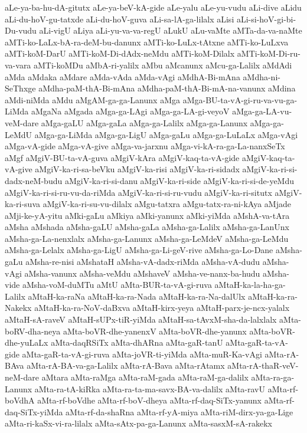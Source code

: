 {aLe-ya-ba-hu-dA-gitutx
aLe-ya-beV-kA-gide
aLe-yalu
aLe-yu-vudu
aLi-dive
aLidu
aLi-du-hoV-gu-tatxde
aLi-du-hoV-guva
aLi-sa-lA-ga-lilalx
aLisi
aLi-si-hoV-gi-bi-Du-vudu
aLi-vigU
aLiya
aLi-yu-va-va-regU
aLukU
aLu-vaMte
aMTa-da-va-naMte
aMTi-ko-LaLx-bA-ra-deM-bu-danunx
aMTi-ko-LuLx-tAtxne
aMTi-ko-LuLxva
aMTi-koM-DarU
aMTi-koM-Di-dAdx-neMdu
aMTi-koM-Dilalx
aMTi-koM-Di-ru-va-vara
aMTi-koMDu
aMbA-ri-yalilx
aMbu
aMcanunx
aMcu-ga-Lalilx
aMdAdi
aMda
aMdaka
aMdare
aMda-vAda
aMda-vAgi
aMdhA-Bi-mAna
aMdha-ni-SeThxge
aMdha-paM-thA-Bi-mAna
aMdha-paM-thA-Bi-mA-na-vanunx
aMdina
aMdi-niMda
aMdu
aMgAM-ga-ga-Lanunx
aMga
aMga-BU-ta-vA-gi-ru-va-vu-ga-LiMda
aMgaNa
aMgada
aMga-ga-LAgi
aMga-ga-LA-gi-veyoV
aMga-ga-LA-vu-veM-dare
aMga-gaLU
aMga-gaLa
aMga-ga-Lalilx
aMga-ga-Lanunx
aMga-ga-LeMdU
aMga-ga-LiMda
aMga-ga-LigU
aMga-gaLu
aMga-ga-LuLaLx
aMga-vAgi
aMga-vA-gide
aMga-vA-give
aMga-va-jarxnu
aMga-vi-kA-ra-ga-La-nanxSeTx
aMgf
aMgiV-BU-ta-vA-guva
aMgiV-kAra
aMgiV-kaq-ta-vA-gide
aMgiV-kaq-ta-vA-give
aMgiV-ka-ri-sa-beVku
aMgiV-ka-risi
aMgiV-ka-ri-sidadx
aMgiV-ka-ri-si-dadx-neM-budu
aMgiV-ka-ri-si-danu
aMgiV-ka-ri-side
aMgiV-ka-ri-si-de-yeMdu
aMgiV-ka-ri-si-ru-vu-da-riMda
aMgiV-ka-ri-si-ru-vudu
aMgiV-ka-ri-situtx
aMgiV-ka-ri-suva
aMgiV-ka-ri-su-vu-dilalx
aMgu-tatxra
aMgu-tatx-ra-ni-kAya
aMjade
aMji-ke-yA-yitu
aMki-gaLu
aMkiya
aMki-yanunx
aMki-yiMda
aMshA-va-tAra
aMsha
aMshada
aMsha-gaLU
aMsha-gaLa
aMsha-ga-Lalilx
aMsha-ga-LanUnx
aMsha-ga-La-nenxlalx
aMsha-ga-Lanunx
aMsha-ga-LeMdeV
aMsha-ga-LeMdu
aMsha-ga-Lelalx
aMsha-ga-LigU
aMsha-ga-Li-geV-rive
aMsha-ga-Lo-Dane
aMsha-gaLu
aMsha-re-nisi
aMshataH
aMsha-vA-dadx-riMda
aMsha-vA-dudu
aMsha-vAgi
aMsha-vanunx
aMsha-veMdu
aMshaveV
aMsha-ve-nanx-ba-hudu
aMsha-vide
aMsha-voM-duMTu
aMtU
aMta-BUR-ta-vA-gi-ruva
aMtaH-ka-la-ha-ga-Lalilx
aMtaH-ka-raNa
aMtaH-ka-ra-Nada
aMtaH-ka-ra-Na-dalUlx
aMtaH-ka-ra-Nakekx
aMtaH-ka-ra-NoV-daBxva
aMtaH-kirx-yeya
aMtaH-parx-je-ncx-yalalx
aMtaH-sA-raveV
aMtaH-sUPx-tiR-yiMda
aMtaH-sa-tAvxM-sha-da-lalxlalx
aMta-boRV-dha-neya
aMta-boVR-dhe-yanenxV
aMta-boVR-dhe-yanunx
aMta-boVR-dhe-yuLaLx
aMta-daqRSiTx
aMta-dhARna
aMta-gaR-tanU
aMta-gaR-ta-vA-gide
aMta-gaR-ta-vA-gi-ruva
aMta-joVR-ti-yiMda
aMta-muR-Ka-vAgi
aMta-rA-BAva
aMta-rA-BA-va-ga-Lalilx
aMta-rA-Bava
aMta-rAtamx
aMta-rA-thaR-veV-neM-dare
aMtara
aMta-raMga
aMta-raM-gada
aMta-raM-ga-dalilx
aMta-ra-ga-Lanunx
aMta-ra-tA-kiRka
aMta-ra-ta-ma-savx-BA-va-dalilx
aMta-ravU
aMta-rf-boVdhA
aMta-rf-boVdhe
aMta-rf-boV-dheya
aMta-rf-daq-SiTx-yanunx
aMta-rf-daq-SiTx-yiMda
aMta-rf-da-shaRna
aMta-rf-yA-miya
aMta-riM-dirx-ya-ga-Lige
aMta-ri-kaSx-vi-ra-lilalx
aMta-sAtx-pa-ga-Lanunx
aMta-sasxM-sA-rakekx
}
